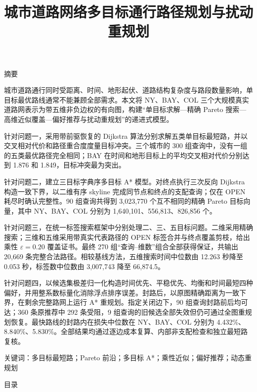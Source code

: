 \documentclass[UTF8,a4paper]{ctexart}
\title{\heiti\zihao{3} 城市道路网络多目标通行路径规划与扰动重规划}
\author{}
\date{}
\newcommand{\eps}{\varepsilon}
\begin{document}
\songti\linespread{1.15}\selectfont
\setcounter{page}{1}

\maketitle
\vspace{-1.8cm}

{\centering\heiti{} 摘\quad 要\par}
\vspace{0.6em}

城市道路通行同时受距离、时间、地形起伏、道路结构复杂度与路段数量影响，单目标最优路线通常不能兼顾全部需求。本文将 NY、BAY、COL 三个大规模真实道路网表示为带五维非负边权的有向图，构建“单目标求解---精确 Pareto 搜索---高维近似覆盖---偏好推荐与扰动重规划”的递进式模型。

针对问题一，采用带前驱恢复的 Dijkstra 算法分别求解五类单目标最短路，并以交叉相对代价和路径重合度度量目标冲突。三个城市的 300 组查询中，没有一组的五类最优路径完全相同；BAY 在时间和地形目标上的平均交叉相对代价分别达到 1.876 和 1.849，目标冲突最为突出。

针对问题二，建立三目标字典序多目标 A* 模型。对终点执行三次反向 Dijkstra 构造一致下界，以二维有序 skyline 完成同节点和终点的支配查询；仅在 OPEN 耗尽时确认完整性。90 组查询共得到 3,023,770 个互不相同的精确 Pareto 目标向量，其中 NY、BAY、COL 分别为 1,640,101、556,813、826,856 个。

针对问题三，在统一标签搜索框架中分别处理二、三、五目标问题。二维采用精确搜索；三维和五维采用带真实代表路径的 OPEN 标签合并与终点覆盖剪枝，给出乘性 $\eps=0.20$ 覆盖证书。最终 270 组“查询--维数”组合全部获得保证，共输出 20,669 条完整合法路径。相较基线方法，五维搜索时间中位数由 12.263 秒降至 0.053 秒，标签数中位数由 3,007,743 降至 66,874.5。

针对问题四，以候选集极差归一化构造时间优先、平稳优先、均衡和时间最短四种偏好，并用整系数标量化消除浮点排序误差。封路后，以原图精确距离为一致下界，在剩余完整路网上运行 A* 重规划。指定关闭边下，90 组查询封路前后均可达；360 条原推荐中 292 条受阻，9 组查询的旧候选全部失效但仍可通过全图重规划恢复。最快路线的封路内在损失中位数在 NY、BAY、COL 分别为 4.432\%、8.840\%、5.830\%。全部结果均通过逐边成本复算、内部非支配检查和独立最短路复核。

\vspace{1em}
{\heiti 关键词：}多目标最短路；Pareto 前沿；多目标 A*；乘性近似；偏好推荐；动态重规划

\newpage
{\centering\heiti{} 目\quad 录\par}
\vspace{1em}
\tableofcontents
\end{document}
